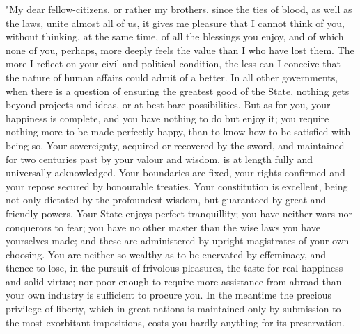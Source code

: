 \documentclass[12pt]{report}
\begin{document}
"My dear fellow-citizens, or rather my brothers, since the ties of blood, as well as the laws, unite almost all of us, it gives me pleasure that I cannot think of you, without thinking, at the same time, of all the blessings you enjoy, and of which none of you, perhaps, more deeply feels the value than I who have lost them. The more I reflect on your civil and political condition, the less can I conceive that the nature of human affairs could admit of a better. In all other governments, when there is a question of ensuring the greatest good of the State, nothing gets beyond projects and ideas, or at best bare possibilities. But as for you, your happiness is complete, and you have nothing to do but enjoy it; you require nothing more to be made perfectly happy, than to know how to be satisfied with being so. Your sovereignty, acquired or recovered by the sword, and maintained for two centuries past by your valour and wisdom, is at length fully and universally acknowledged. Your boundaries are fixed, your rights confirmed and your repose secured by honourable treaties. Your constitution is excellent, being not only dictated by the profoundest wisdom, but guaranteed by great and friendly powers. Your State enjoys perfect tranquillity; you have neither wars nor conquerors to fear; you have no other master than the wise laws you have yourselves made; and these are administered by upright magistrates of your own choosing. You are neither so wealthy as to be enervated by effeminacy, and thence to lose, in the pursuit of frivolous pleasures, the taste for real happiness and solid virtue; nor poor enough to require more assistance from abroad than your own industry is sufficient to procure you. In the meantime the precious privilege of liberty, which in great nations is maintained only by submission to the most exorbitant impositions, costs you hardly anything for its preservation.
\end{document}
